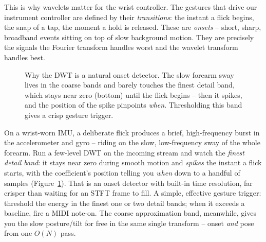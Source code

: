 This is why wavelets matter for the wrist controller. The gestures that drive our
instrument controller are defined by their \emph{transitions}: the instant a flick
begins, the snap of a tap, the moment a hold is released. These are \emph{onsets}
-- short, sharp, broadband events sitting on top of slow background motion. They
are precisely the signals the Fourier transform handles worst and the wavelet
transform handles best.

\begin{figure}[H]
\centering
{}
\caption{Why the DWT is a natural onset detector. The slow forearm sway lives in
the coarse bands and barely touches the finest detail band, which stays near zero
(bottom) until the flick begins -- then it spikes, and the position of the spike
pinpoints \emph{when}. Thresholding this band gives a crisp gesture trigger.}
\label{ch24:onset-fig}
\end{figure}

\begin{goalbox}
On a wrist-worn IMU, a deliberate flick produces a brief, high-frequency burst in
the accelerometer and gyro -- riding on the slow, low-frequency sway of the whole
forearm. Run a few-level DWT on the incoming stream and watch the \emph{finest
detail band}: it stays near zero during smooth motion and \emph{spikes} the
instant a flick starts, with the coefficient's position telling you \emph{when}
down to a handful of samples (Figure~\ref{ch24:onset-fig}). That is an onset detector with built-in time
resolution, far crisper than waiting for an STFT frame to fill. A simple,
effective gesture trigger: threshold the energy in the finest one or two detail
bands; when it exceeds a baseline, fire a MIDI note-on. The coarse approximation
band, meanwhile, gives you the slow posture/tilt for free in the same single
transform -- onset \emph{and} pose from one $O(N)$ pass.
\end{goalbox}

